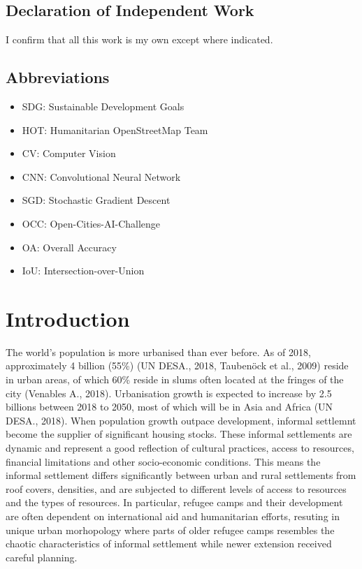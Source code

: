 \documentclass[11pt, a4paper, twoside]{report}
\begin{document}
\newpage
\section{Declaration of Independent Work}

I confirm that all this work is my own except where indicated.
\newpage


\tableofcontents

\newpage

\listoffigures

\newpage

\listoftables
\clearpage

\newpage

\section{Abbreviations}

\begin{itemize}
  \item SDG: Sustainable Development Goals
  \item HOT: Humanitarian OpenStreetMap Team
  \item CV: Computer Vision
  \item CNN: Convolutional Neural Network
  \item SGD: Stochastic Gradient Descent
  \item OCC: Open-Cities-AI-Challenge
  \item OA: Overall Accuracy
  \item IoU: Intersection-over-Union
\end{itemize}

\newpage

\chapter{Introduction}\label{Intro}

The world’s population is more urbanised than ever before. As of 2018, approximately 4 billion (55\%) (UN DESA., 2018, Taubenöck et al., 2009) reside in urban areas, of which 60\% reside in slums often located at the fringes of the city (Venables A., 2018). Urbanisation growth is expected to increase by 2.5 billions between 2018 to 2050, most of which will be in Asia and Africa (UN DESA., 2018). When population growth outpace development, informal settlemnt become the supplier of significant housing stocks. These informal settlements are dynamic and represent a good reflection of cultural practices, access to resources, financial limitations and other socio-economic conditions. This means the informal settlement differs significantly between urban and rural settlements from roof covers, densities, and are subjected to different levels of access to resources and the types of resources. In particular, refugee camps and their development are often dependent on international aid and humanitarian efforts, resuting in unique urban morhopology where parts of older refugee camps resembles the chaotic characteristics of informal settlement while newer extension received careful planning.\\\par
\end{document}
